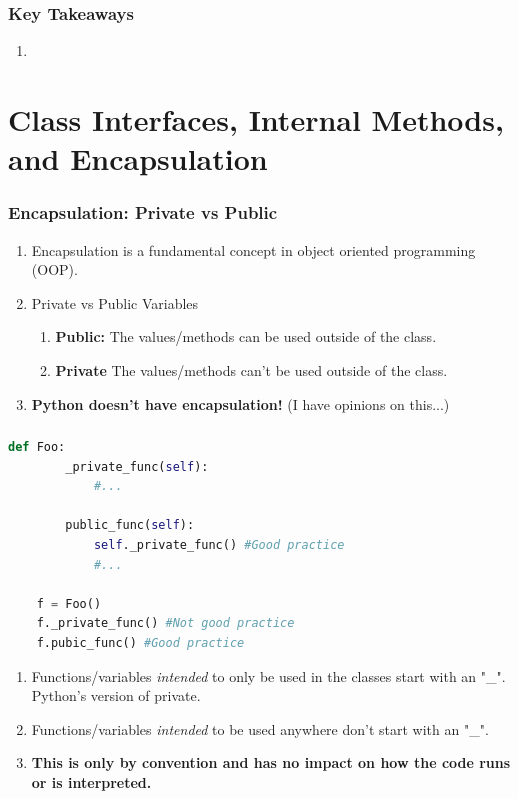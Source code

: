 \documentclass{beamer}
\begin{document}
%
%
\begin{frame}[fragile]
    \frametitle{Key Takeaways}
    \begin{enumerate}[A]
        \item 
    \end{enumerate}
\end{frame}


\section{Class Interfaces, Internal Methods, and Encapsulation}

%
%
\begin{frame}[fragile]
    \frametitle{Encapsulation: Private vs Public}
    \vfill
    \begin{enumerate}[A]
        \item Encapsulation is a fundamental concept in object oriented programming (OOP).
        \item Private vs Public Variables
        \begin{enumerate}[A]
            \item \textbf{Public: } The values/methods can be used outside of the class.
            \item \textbf{Private } The values/methods can't be used outside of the class.
        \end{enumerate}
    \item \textbf{Python doesn't have encapsulation!} (I have opinions on this...)
    \end{enumerate}
    \vfill
\end{frame}

%
%
\begin{frame}[fragile]
    \frametitle{}
    \begin{lstlisting}[language=Python, autogobble]
    def Foo:
        _private_func(self):
            #...

        public_func(self):
            self._private_func() #Good practice
            #...

    f = Foo()
    f._private_func() #Not good practice
    f.pubic_func() #Good practice
    \end{lstlisting}
    \vfill
    \begin{enumerate}[A]
        \item Functions/variables \textit{intended} to only be used in the classes start with an "\_". Python's version of private.
        \item Functions/variables \textit{intended} to be used anywhere don't start with an "\_".
        \item \textbf{This is only by convention and has no impact on how the code runs or is interpreted.}
    \end{enumerate}
\end{frame}
\end{document}
